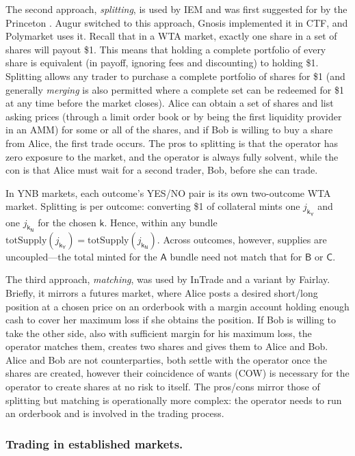 The second approach, \textit{splitting}, is used by IEM and was first suggested for \depms by the Princeton \depm. Augur switched to this approach, Gnosis implemented it in CTF, and Polymarket uses it. Recall that in a WTA market, exactly one share in a set of shares will payout \$1. This means that holding a complete portfolio of every share is equivalent (in payoff, ignoring fees and discounting) to holding \$1. Splitting allows any trader to purchase a complete portfolio of shares for \$1 (and generally \textit{merging} is also permitted where a complete set can be redeemed for \$1 at any time before the market closes). Alice can obtain a set of shares and list asking prices (through a limit order book or by being the first liquidity provider in an AMM) for some or all of the shares, and if Bob is willing to buy a share from Alice, the first trade occurs. The pros to splitting is that the operator has zero exposure to the market, and the operator is always fully solvent, while the con is that Alice must wait for a second trader, Bob, before she can trade. 

In YNB markets, each outcome’s YES/NO pair is its own two-outcome WTA market. Splitting is per outcome: converting \$1 of collateral mints one \(j_{\mathsf{k_Y}}\) and one \(j_{\mathsf{k_N}}\) for the chosen \(\mathsf{k}\). Hence, within any bundle \(\mathrm{totSupply}(j_{\mathsf{k_Y}})=\mathrm{totSupply}(j_{\mathsf{k_N}})\). Across outcomes, however, supplies are uncoupled—the total minted for the \(\mathsf{A}\) bundle need not match that for \(\mathsf{B}\) or \(\mathsf{C}\).

The third approach, \textit{matching}, was used by InTrade and a variant by Fairlay. Briefly, it mirrors a futures market, where Alice posts a desired short/long position at a chosen price on an orderbook with a margin account holding enough cash to cover her maximum loss if she obtains the position. If Bob is willing to take the other side, also with sufficient margin for his maximum loss, the operator matches them, creates two shares and gives them to Alice and Bob. Alice and Bob are not counterparties, both settle with the operator once the shares are created, however their coincidence of wants (COW) is necessary for the operator to create shares at no risk to itself. The pros/cons mirror those of splitting but matching is operationally more complex: the operator needs to run an orderbook and is involved in the trading process. 

\subsubsection{Trading in established markets.}

